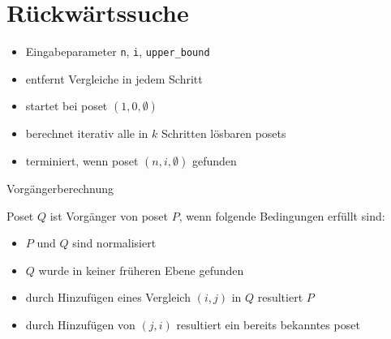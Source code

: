 \section{Rückwärtssuche}
\sectionframe{\insertsection}
\begin{frame}{\insertsection}
  \begin{itemize}
    \item<+-> Eingabeparameter \texttt{n}, \texttt{i}, \texttt{upper\_bound}
    \item<+-> entfernt Vergleiche in jedem Schritt
    \item<+-> startet bei poset $(1, 0, \emptyset)$ %
    \item<+-> berechnet iterativ alle in $k$ Schritten lösbaren posets %
    \item<+-> terminiert, wenn poset $(n, i, \emptyset)$ gefunden %
  \end{itemize}
\end{frame}

\begin{frame}{Vorgängerberechnung}
  \begin{definition}[Vorgänger]
    Poset $Q$ ist Vorgänger von poset $P$, wenn folgende Bedingungen erfüllt sind:
    \begin{itemize}
      \item<+-> $P$ und $Q$ sind normalisiert %
      \item<+-> $Q$ wurde in keiner früheren Ebene gefunden %
      \item<+-> durch Hinzufügen eines Vergleich $(i, j)$ in $Q$ resultiert $P$ %
      \item<+-> durch Hinzufügen von $(j, i)$ resultiert ein bereits bekanntes poset %
    \end{itemize}
  \end{definition}
\end{frame}


